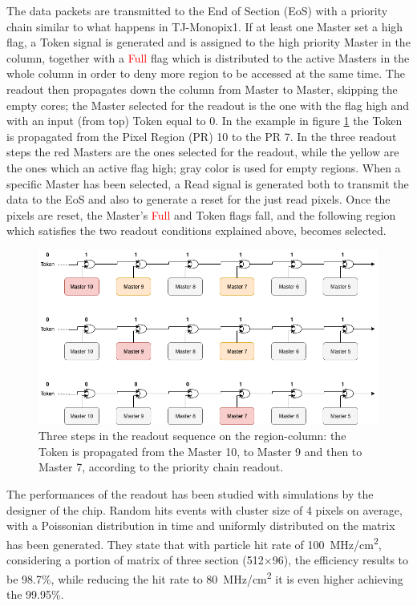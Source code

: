         The data packets are transmitted to the End of Section (EoS) with a priority chain similar to what happens in TJ-Monopix1. 
        If at least one Master set a high flag, a \textcolor{Cerulean}{Token} signal is generated and is assigned to the high priority Master in the column, together with a \textcolor{red}{Full} flag which is distributed to the active Masters in the whole column in order to deny more region to be accessed at the same time.
        The readout then propagates down the column from Master to Master, skipping the empty cores; the Master selected for the readout is the one with the flag high and with an input (from top) \textcolor{Cerulean}{Token} equal to 0. 
        In the example in figure \ref{fig:token_chain} the \textcolor{Cerulean}{Token} is propagated from the Pixel Region (PR) 10 to the PR 7. 
        In the three readout steps the red Masters are the ones selected for the readout, while the yellow are the ones which an active flag high; gray color is used for empty regions. When a specific Master has been selected, a \textcolor{Cerulean}{Read} signal is generated both to transmit the data to the EoS and also to generate a reset for the just read pixels.
        Once the pixels are reset, the Master's \textcolor{red}{Full} 
        and \textcolor{Cerulean}{Token} flags fall, and the following region which satisfies the two readout conditions explained above, becomes selected. 
        \begin{figure}[h!]
            \centering
            \includegraphics[width=.95\linewidth]{figures/ARCADIA/token_chain.png}
            \caption{Three steps in the readout sequence on the region-column: the Token is propagated from the Master 10, to Master 9 and then to Master 7, according to the priority chain readout.}
            \label{fig:token_chain}
        \end{figure}

    The performances of the readout has been studied with simulations by the designer of the chip. 
    Random hits events with cluster size of 4 pixels on average, with a Poissonian distribution in time and uniformly distributed on the matrix has been generated.
    They state that with particle hit rate of \SI{100}{MHz/cm\squared}, considering a portion of matrix of three section (512$\times$96), the efficiency results to be 98.7\%, while reducing the hit rate to \SI{80}{MHz/cm\squared} it is even higher achieving the 99.95\%. 
